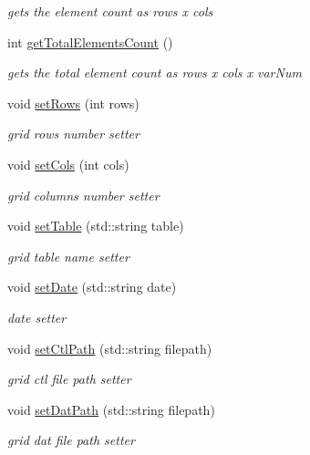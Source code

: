 \begin{DoxyCompactItemize}
\begin{DoxyCompactList}\small\item\em gets the element count as rows x cols \end{DoxyCompactList}\item 
int \hyperlink{classfwi_1_1grid_1_1Grid_aa140c12f1edfb152b7e859488969cf3e}{get\-Total\-Elements\-Count} ()
\begin{DoxyCompactList}\small\item\em gets the total element count as rows x cols x var\-Num \end{DoxyCompactList}\item 
void \hyperlink{classfwi_1_1grid_1_1Grid_aefe04321df7e26e6510293846d93f983}{set\-Rows} (int rows)
\begin{DoxyCompactList}\small\item\em grid rows number setter \end{DoxyCompactList}\item 
void \hyperlink{classfwi_1_1grid_1_1Grid_a8ee0c76d69626d72bc385c5cb3cdf268}{set\-Cols} (int cols)
\begin{DoxyCompactList}\small\item\em grid columns number setter \end{DoxyCompactList}\item 
void \hyperlink{classfwi_1_1grid_1_1Grid_a78f4a38e86a245ee62769e5f37bff1c6}{set\-Table} (std\-::string table)
\begin{DoxyCompactList}\small\item\em grid table name setter \end{DoxyCompactList}\item 
void \hyperlink{classfwi_1_1grid_1_1Grid_a38c849794390871a95b8c7dbe505e00d}{set\-Date} (std\-::string date)
\begin{DoxyCompactList}\small\item\em date setter \end{DoxyCompactList}\item 
void \hyperlink{classfwi_1_1grid_1_1Grid_a5beeb3bf022ee1dec908f76bf1b7ff5d}{set\-Ctl\-Path} (std\-::string filepath)
\begin{DoxyCompactList}\small\item\em grid ctl file path setter \end{DoxyCompactList}\item 
void \hyperlink{classfwi_1_1grid_1_1Grid_ac7df5d5cc5b9d184c5eceb03737bb598}{set\-Dat\-Path} (std\-::string filepath)
\begin{DoxyCompactList}\small\item\em grid dat file path setter \end{DoxyCompactList}\item 

\end{DoxyCompactItemize}
